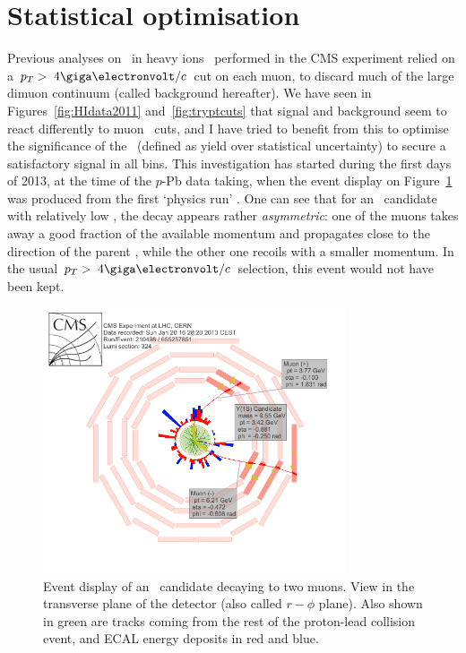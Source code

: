 \section{Statistical optimisation}

Previous analyses on \PgU\ in heavy ions~\cite{HIN-11-007,11-011} performed in the CMS
experiment relied on a $\pt > \;4 \GeVc$ cut on each muon, to discard
much of the large dimuon continuum (called background hereafter). We
have seen in Figures~\ref{fig:HIdata2011} and~\ref{fig:tryptcuts} that
signal and background seem to react differently to muon \pt\ cuts, and
I have tried to benefit from this to optimise the significance of the \PgUa\
(defined as yield over statistical uncertainty) to
secure a satisfactory signal in all bins. This investigation has
started during the first days of 2013, at the time of the $p$-Pb data
taking, when the event display on Figure~\ref{fig:eventmirabilis} was produced from the
first `physics run'%
. One can see that for an \PgU\ candidate with
relatively low \pt, the decay appears rather \textit{asymmetric}: one of the
muons takes away a good fraction of the available momentum and
propagates close to the direction of the parent \PgU, while
the other one recoils with a smaller momentum. In the usual $\pt > \; 4 \GeVc$ selection, this event would not have been
kept. 


\begin{figure}[h]
\begin{center}
\includegraphics[width=0.8\textwidth]{Chapters/aYield/upsilon_rhophi_detail_white.png}
\caption{Event display of an \PgU\ candidate decaying to two
  muons. View in the transverse plane of the detector (also called
  $r-\phi$ plane). Also shown in green are tracks coming from the rest of the proton-lead
  collision event, and ECAL energy deposits in red and blue.}
\label{fig:eventmirabilis}
\end{center}
\end{figure}

